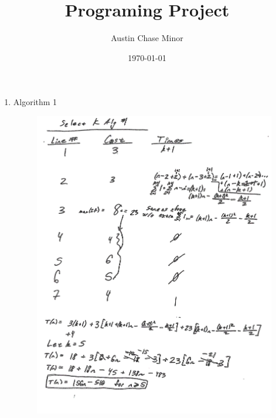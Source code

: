 \documentclass{article}
\author{Austin Chase Minor}
\date{\today}
\title{Programing Project}
\begin{document}
\begin{enumerate}
\item 
  Algorithm 1
  \begin{figure}[H]
    \centering
    \includegraphics[width = \textwidth]{pics/alg1}
  \end{figure}


\end{enumerate}
\end{document}
